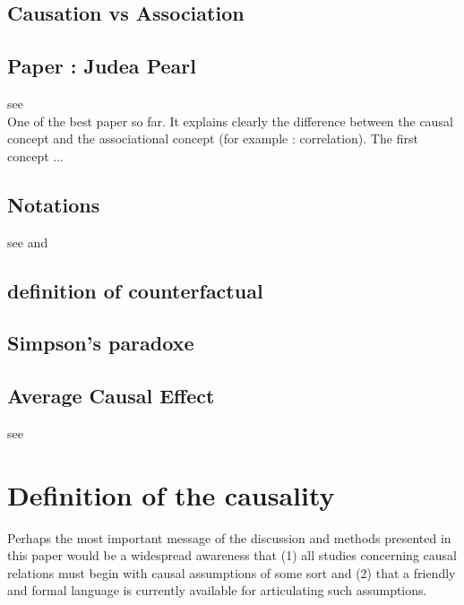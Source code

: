 \documentclass{article}
\begin{document}
\subsection{Causation vs Association}

\subsection{Paper : Judea Pearl}

see \cite{pearl2010mathematics} \\
One of the best paper so far. It explains clearly the difference between the causal concept and the associational concept (for example : correlation). The first concept ...

\subsection{Notations}
see \cite{yao2020survey} and \cite{hernan2020causal}

\subsection{definition of counterfactual}

\subsection{Simpson's paradoxe}

\subsection{Average Causal Effect}

see \cite{hernan2020causal}



\newpage
\section{Definition of the causality}

Perhaps the most important message of the discussion and methods presented in this paper would be a widespread awareness that (1) all studies concerning causal relations must begin with causal assumptions of some sort and (2) that a friendly and formal language is currently available for articulating such assumptions.\cite{pearl2010mathematics}

\cite{rubin2005causal}

\newpage
\nocite{*}    %

\end{document}

